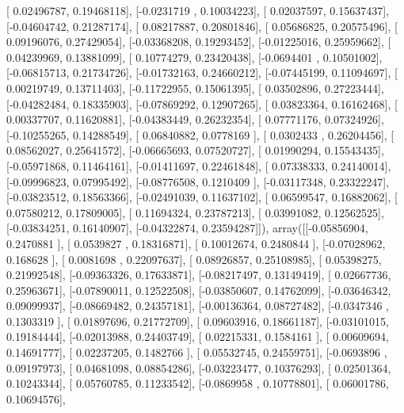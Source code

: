 \documentclass{article}
\begin{document}
       [ 0.02496787,  0.19468118],
       [-0.0231719 ,  0.10034223],
       [ 0.02037597,  0.15637437],
       [-0.04604742,  0.21287174],
       [ 0.08217887,  0.20801846],
       [ 0.05686825,  0.20575496],
       [ 0.09196076,  0.27429054],
       [-0.03368208,  0.19293452],
       [-0.01225016,  0.25959662],
       [ 0.04239969,  0.13881099],
       [ 0.10774279,  0.23420438],
       [-0.0694401 ,  0.10501002],
       [-0.06815713,  0.21734726],
       [-0.01732163,  0.24660212],
       [-0.07445199,  0.11094697],
       [ 0.00219749,  0.13711403],
       [-0.11722955,  0.15061395],
       [ 0.03502896,  0.27223444],
       [-0.04282484,  0.18335903],
       [-0.07869292,  0.12907265],
       [ 0.03823364,  0.16162468],
       [ 0.00337707,  0.11620881],
       [-0.04383449,  0.26232354],
       [ 0.07771176,  0.07324926],
       [-0.10255265,  0.14288549],
       [ 0.06840882,  0.0778169 ],
       [ 0.0302433 ,  0.26204456],
       [ 0.08562027,  0.25641572],
       [-0.06665693,  0.07520727],
       [ 0.01990294,  0.15543435],
       [-0.05971868,  0.11464161],
       [-0.01411697,  0.22461848],
       [ 0.07338333,  0.24140014],
       [-0.09996823,  0.07995492],
       [-0.08776508,  0.1210409 ],
       [-0.03117348,  0.23322247],
       [-0.03823512,  0.18563366],
       [-0.02491039,  0.11637102],
       [ 0.06599547,  0.16882062],
       [ 0.07580212,  0.17809005],
       [ 0.11694324,  0.23787213],
       [ 0.03991082,  0.12562525],
       [-0.03834251,  0.16140907],
       [-0.04322874,  0.23594287]]), array([[-0.05856904,  0.2470881 ],
       [ 0.0539827 ,  0.18316871],
       [ 0.10012674,  0.2480844 ],
       [-0.07028962,  0.168628  ],
       [ 0.0081698 ,  0.22097637],
       [ 0.08926857,  0.25108985],
       [ 0.05398275,  0.21992548],
       [-0.09363326,  0.17633871],
       [-0.08217497,  0.13149419],
       [ 0.02667736,  0.25963671],
       [-0.07890011,  0.12522508],
       [-0.03850607,  0.14762099],
       [-0.03646342,  0.09099937],
       [-0.08669482,  0.24357181],
       [-0.00136364,  0.08727482],
       [-0.0347346 ,  0.1303319 ],
       [ 0.01897696,  0.21772709],
       [ 0.09603916,  0.18661187],
       [-0.03101015,  0.19184444],
       [-0.02013988,  0.24403749],
       [ 0.02215331,  0.1584161 ],
       [ 0.00609694,  0.14691777],
       [ 0.02237205,  0.1482766 ],
       [ 0.05532745,  0.24559751],
       [-0.0693896 ,  0.09197973],
       [ 0.04681098,  0.08854286],
       [-0.03223477,  0.10376293],
       [ 0.02501364,  0.10243344],
       [ 0.05760785,  0.11233542],
       [-0.0869958 ,  0.10778801],
       [ 0.06001786,  0.10694576],
\end{document}
